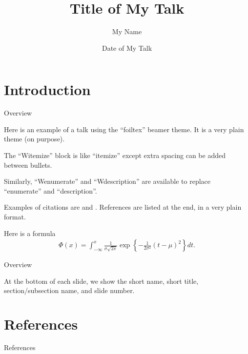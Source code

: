\documentclass[10pt,final,xcolor=svgnames]{beamer}
\begin{document}
\title[Short title]{Title of My Talk}
\author[My Name]{My Name}
\date[Short Date]{Date of My Talk}

\begin{frame}[plain]
\maketitle
\vspace{-1em}
\begin{center}
\vspace{1em}
\end{center}
\end{frame}

\section{Introduction}
\begin{frame}{Overview}
\begin{Witemize}[10pt]
\item Here is an example of a talk using the ``foiltex'' beamer theme. It is a very plain theme (on purpose).
\item The ``Witemize'' block is like ``itemize'' except extra spacing can
be added between bullets.
\item Similarly, ``Wenumerate'' and ``Wdescription'' are
available to replace ``enumerate'' and ``description''.
\item Examples of citations are \citep{cran} and \citet{HastieTibshiraniFriedman2009}. References are listed at
the end, in a very plain format.
\item Here is a formula
%
\begin{align*}
\Phi(x) = \int_{-\infty}^x \frac{1}{\sigma \sqrt{2 \pi}}
\exp\left\{ -\frac{1}{2 \sigma^2} (t - \mu)^2  \right\} dt.
\end{align*}

\end{Witemize}
\end{frame}

\begin{frame}{Overview}
\begin{Witemize}[10pt]
\item At the bottom of each slide, we show the short name, short title, section/subsection name, and slide number.
\end{Witemize}
\end{frame}


\section{References}
\begin{frame}{References}
\small


\end{frame}

\appendix
\end{document}
